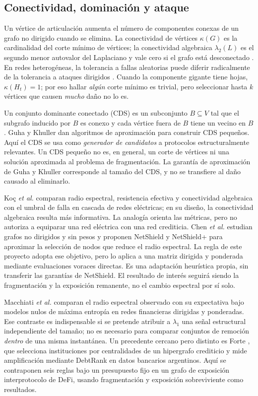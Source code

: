 \documentclass[journal]{IEEEtran}
\begin{document}
\subsection{Conectividad, dominación y ataque}

Un vértice de articulación aumenta el número de componentes conexas de un
grafo no dirigido cuando se elimina.
La conectividad de vértices $\kappa(G)$ es la cardinalidad del corte mínimo de
vértices; la conectividad algebraica $\lambda_2(L)$ es el segundo menor
autovalor del Laplaciano y vale cero si el grafo está desconectado
\cite{fiedler1973algebraic}. En redes heterogéneas, la tolerancia a fallas
aleatorias puede diferir radicalmente de la tolerancia a ataques dirigidos
\cite{albert2000error}. Cuando la componente gigante tiene hojas,
$\kappa(H_t)=1$; por eso hallar \emph{algún} corte mínimo es trivial,
pero seleccionar hasta $k$ vértices que causen \emph{mucho} daño no lo es.

Un conjunto dominante conectado (CDS) es un subconjunto $B\subseteq V$ tal que
el subgrafo inducido por $B$ es conexo y cada vértice fuera de $B$ tiene un
vecino en $B$. Guha y Khuller \cite{guha1998approximation} dan algoritmos de
aproximación para construir CDS pequeños. Aquí el CDS se usa como
\emph{generador de candidatos} a protocolos estructuralmente relevantes. Un CDS
pequeño no es, en general, un corte de vértices ni una solución aproximada al
problema de fragmentación. La garantía de aproximación de Guha y Khuller
corresponde al tamaño del CDS, y no se transfiere al daño causado al eliminarlo.

Koç \emph{et al.} \cite{koc2014topological} comparan radio espectral,
resistencia efectiva y conectividad algebraica con el umbral de falla en
cascada de redes eléctricas; en su diseño, la conectividad algebraica resulta
más informativa. La analogía orienta las métricas, pero no autoriza a equiparar
una red eléctrica con una red crediticia. Chen \emph{et al.}
\cite{chen2016node} estudian grafos no dirigidos y sin pesos y proponen
NetShield y NetShield+ para aproximar la selección de nodos que reduce el
radio espectral. La regla de este proyecto adopta ese objetivo, pero lo aplica
a una matriz dirigida y ponderada mediante evaluaciones voraces directas.
Es una adaptación heurística propia, sin transferir las garantías de
NetShield. El resultado de interés seguirá siendo la fragmentación y la
exposición remanente, no el cambio espectral por sí solo.

Macchiati \emph{et al.} \cite{macchiati2024spectral} comparan el radio
espectral observado con su expectativa bajo modelos nulos de máxima entropía
en redes financieras dirigidas y ponderadas. Ese contraste es indispensable si
se pretende atribuir a $\lambda_1$ una señal estructural independiente del
tamaño; no es necesario para comparar conjuntos de remoción \emph{dentro} de
una misma instantánea. Un precedente cercano pero distinto es Forte
\cite{forte2026hypergraphs}, que selecciona instituciones por centralidades de
un hipergrafo crediticio y mide amplificación mediante DebtRank en datos
bancarios argentinos. Aquí se contraponen seis reglas bajo un presupuesto fijo
en un grafo de exposición interprotocolo de DeFi, usando fragmentación y
exposición sobreviviente como resultados.
\end{document}
